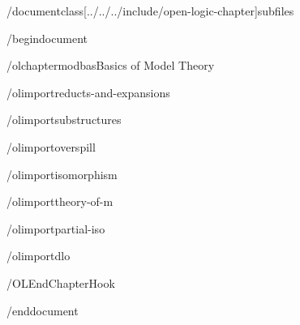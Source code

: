 
/documentclass[../../../include/open-logic-chapter]{subfiles}

/begin{document}

/olchapter{mod}{bas}{Basics of Model Theory}

/olimport{reducts-and-expansions}

/olimport{substructures}

/olimport{overspill}

/olimport{isomorphism}

/olimport{theory-of-m}

/olimport{partial-iso}

/olimport{dlo}


/OLEndChapterHook

/end{document}
